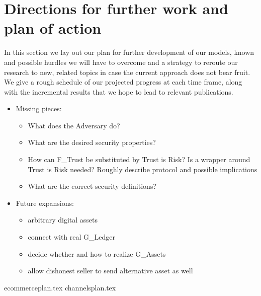 \section{Directions for further work and plan of action}
\label{sec:plan}
  In this section we lay out our plan for further development of our models, known and
  possible hurdles we will have to overcome and a strategy to reroute our research to new,
  related topics in case the current approach does not bear fruit. We give a rough
  schedule of our projected progress at each time frame, along with the incremental
  results that we hope to lead to relevant publications.
  \begin{itemize}
    \item Missing pieces:
    \begin{itemize}
      \item What does the Adversary do?
      \item What are the desired security properties?
      \item How can F\_Trust be substituted by Trust is Risk? Is a wrapper around Trust is
      Risk needed? Roughly describe protocol and possible implications
      \item What are the correct security definitions?
    \end{itemize}
    \item Future expansions:
    \begin{itemize}
      \item arbitrary digital assets
      \item connect with real G\_Ledger
      \item decide whether and how to realize G\_Assets
      \item allow dishonest seller to send alternative asset as well
    \end{itemize}
  \end{itemize}

  {ecommerceplan.tex}
  {channelsplan.tex}
